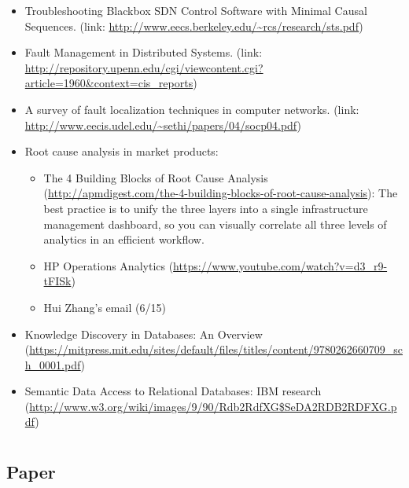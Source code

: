 \documentclass{article}
\begin{document}
\begin{itemize}

\item Troubleshooting Blackbox SDN Control Software with Minimal Causal
Sequences. (link: \url{http://www.eecs.berkeley.edu/~rcs/research/sts.pdf})

\item Fault Management in Distributed Systems. (link:
\url{http://repository.upenn.edu/cgi/viewcontent.cgi?article=1960&context=cis_reports}) 

\item A survey of fault localization techniques in computer networks. (link:
  \url{http://www.eecis.udel.edu/~sethi/papers/04/socp04.pdf})

\item Root cause analysis in market products:

  \begin{itemize}
  \item The 4 Building Blocks of Root Cause Analysis
    (\url{http://apmdigest.com/the-4-building-blocks-of-root-cause-analysis}): The
    best practice is to unify the three layers into a single infrastructure
    management dashboard, so you can visually correlate all three levels of
    analytics in an efficient workflow.
  \item HP Operations Analytics (\url{https://www.youtube.com/watch?v=d3_r9-tFISk})
  \item Hui Zhang's email (6/15)
  \end{itemize}

\item Knowledge Discovery in Databases: An Overview 
(\url{https://mitpress.mit.edu/sites/default/files/titles/content/9780262660709_sch_0001.pdf})

\item Semantic Data Access to Relational Databases: IBM research
(\url{http://www.w3.org/wiki/images/9/90/Rdb2RdfXG$SeDA2RDB2RDFXG.pdf})

\end{itemize}

\section{\saf{}}
\label{sec:saf}

\subsection{Paper}
\label{sec:safpaper}
\end{document}
